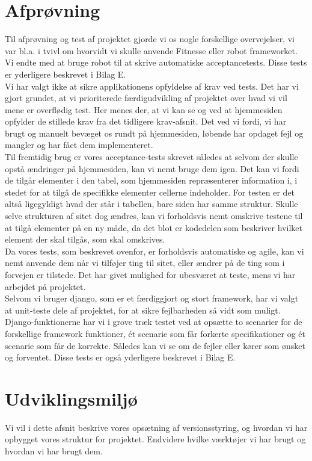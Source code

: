 \documentclass[12pt]{article}
\begin{document}
\section{Afprøvning}
\label{sec:afproevning}
Til afprøvning og test af projektet gjorde vi os nogle forskellige overvejelser, vi var bl.a. i tvivl om hvorvidt vi
skulle anvende Fitnesse eller robot frameworket. Vi endte med at bruge robot til at skrive automatiske acceptancetests.
Disse tests er yderligere beskrevet i Bilag E.\\
Vi har valgt ikke at sikre applikationens opfyldelse af krav ved tests. Det har vi gjort grundet, at vi prioriterede
færdigudvikling af projektet over hvad vi vil mene er overflødig test. Her menes der, at vi kan se og ved at hjemmesiden
opfylder de stillede krav fra det tidligere krav-afsnit. Det ved vi fordi, vi har brugt og manuelt bevæget os rundt på
hjemmesiden, løbende har opdaget fejl og mangler og har fået dem implementeret. \\
Til fremtidig brug er vores acceptance-tests skrevet således at selvom der skulle opstå ændringer på hjemmesiden, kan vi
nemt bruge dem igen. Det kan vi fordi de tilgår elementer i den tabel, som hjemmesiden repræsenterer information i, i
stedet for at tilgå de specifikke elementer cellerne indeholder. For testen er det altså ligegyldigt hvad der står i
tabellen, bare siden har samme struktur. Skulle selve strukturen af sitet dog ændres, kan vi forholdsvis nemt omskrive
testene til at tilgå elementer på en ny måde, da det blot er kodedelen som beskriver hvilket element der skal tilgås, som
skal omskrives. \\ 
Da vores tests, som beskrevet ovenfor, er forholdsvis automatiske og agile, kan vi nemt anvende dem når vi tilføjer ting
til sitet, eller ændrer på de ting som i forvejen er tilstede. Det har givet mulighed for ubesværet at teste, mens vi har
arbejdet på projektet. \\
Selvom vi bruger django, som er et færdiggjort og stort framework, har vi valgt at unit-teste dele af projektet, for at
sikre fejlbarheden så vidt som muligt. Django-funktionerne har vi i grove træk testet ved at opsætte to scenarier for de
forskellige framework funktioner, ét scenarie som får forkerte specifikationer og ét scenarie som får de korrekte. Således
kan vi se om de fejler eller kører som ønsket og forventet. Disse tests er også yderligere beskrevet i Bilag E. 

\section{Udviklingsmiljø}
\label{sec:udvikling}
Vi vil i dette afsnit beskrive vores opsætning af versionsstyring, og hvordan vi har opbygget vores struktur for projektet. Endvidere hvilke værktøjer vi har brugt og hvordan vi har brugt dem.
\end{document}
